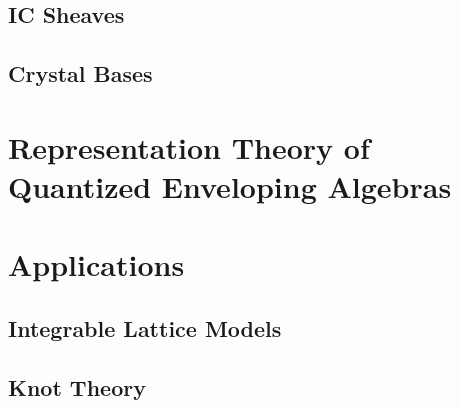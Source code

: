 \documentclass{book}
\begin{document}
  \section{IC Sheaves}

  \section{Crystal Bases}


\chapter{Representation Theory of Quantized Enveloping Algebras}


\chapter{Applications}

  \section{Integrable Lattice Models}

  \section{Knot Theory}
\end{document}

